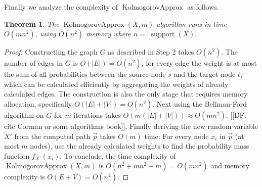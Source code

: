 \documentclass{article}
\newtheorem{theorem}[thm]{Theorem}
\DeclareMathOperator{\support}{support}
\DeclareMathOperator{\KlmApprox}{KolmogorovApprox}
\begin{document}
Finally we analyze the complexity of $\KlmApprox$ as follows.


\begin{theorem}\label{the:complexity}
	The $\KlmApprox(X,m)$ algorithm runs in time $O(mn^2)$, using $O(n^2)$ memory where $n=|\support(X)|$.
\end{theorem}

\begin{proof}
	Constructing the graph $G$ as described in Step 2 takes $O(n^2)$. The number of edges in $G$ is $O(|E|)=O(n^2)$, for every edge the weight is at most the sum of all probabilities between the source node $s$ and the target node $t$, which can be calculated efficiently by aggregating the weights of already calculated edges. 
	The construction is also the only stage that requires memory allocation, specifically $O(|E|+|V|)=O(n^2)$.
	Next using the Bellman-Ford algorithm on $G$ for $m$ iterations   takes $O(m(|E|+|V|))\approx O(mn^2)$. [[DF: cite Corman or some algorithms book]]. 
	Finally deriving the new random variable $X'$ from the computed path $\vec{p}$ takes $O(m)$ time: For every node $x_i$ in $\vec{p}$ (at most $m$ nodes), use the already calculated weights to find the probability mass function $f_{X'}(x_i)$. 
	To conclude, the time complexity  of $\KlmApprox(X,m)$ is $O(n^2+mn^2+m)=O(mn^2)$ and memory complexity is $O(E+V)=O(n^2)$.
\end{proof}






\end{document}
